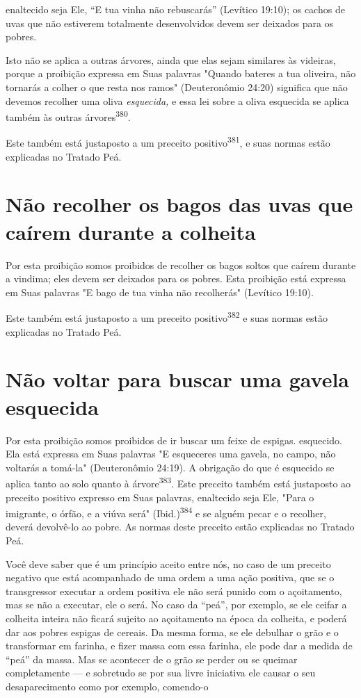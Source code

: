 enaltecido seja Ele, ``E tua vinha não rebuscarás'' (Levítico 19:10); os
cachos de uvas que não estiverem totalmente desenvolvidos devem ser
deixados para os pobres.

Isto não se aplica a outras árvores, ainda que elas sejam similares às
videiras, porque a proibição expressa em Suas palavras "Quando bateres a
tua oliveira, não tornarás a colher o que resta nos ramos" (Deuteronômio
24:20) significa que não devemos recolher uma oliva \emph{esquecida,} e
essa lei sobre a oli­va esquecida se aplica também às outras
árvores\textsuperscript{380}.

Este também está justaposto a um preceito positivo\textsuperscript{381},
e suas nor­mas estão explicadas no Tratado Peá.

\section{Não recolher os bagos das uvas que caírem durante a colheita}

Por esta proibição somos proibidos de recolher os bagos soltos que
caírem durante a vindima; eles devem ser deixados para os pobres. Esta
proibi­ção está expressa em Suas palavras "E bago de tua vinha não
recolherás" (Leví­tico 19:10).

Este também está justaposto a um preceito positivo\textsuperscript{382}
e suas nor­mas estão explicadas no Tratado Peá.

\section{Não voltar para buscar uma gavela esquecida}

Por esta proibição somos proibidos de ir buscar um feixe de espigas.
esquecido. Ela está expressa em Suas palavras "E esqueceres uma gavela,
no campo, não voltarás a tomá-la" (Deuteronômio 24:19). A obrigação do
que é esquecido se aplica tanto ao solo quanto à
árvore\textsuperscript{383}. Este preceito também está justaposto ao
preceito positivo expresso em Suas palavras, enaltecido seja Ele, "Para
o imigrante, o órfão, e a viúva será" (Ibid.)\textsuperscript{384} e se
alguém pecar e o re­colher, deverá devolvê-lo ao pobre. As normas deste
preceito estão explicadas no Tratado Peá.

Você deve saber que é um princípio aceito entre nós, no caso de um
preceito negativo que está acompanhado de uma ordem a uma ação positiva,
que se o transgressor executar a ordem positiva ele não será punido com
o açoitamento, mas se não a executar, ele o será. No caso da ``peá'', por
exemplo, se ele ceifar a colheita inteira não ficará sujeito ao
açoitamento na época da colheita, e poderá dar aos pobres espigas de
cereais. Da mesma for­ma, se ele debulhar o grão e o transformar em
farinha, e fizer massa com essa farinha, ele pode dar a medida de ``peá''
da massa. Mas se acontecer de o grão se perder ou se queimar
completamente --- e sobretudo se por sua livre iniciativa ele causar o
seu desaparecimento como por exemplo, comendo-o


